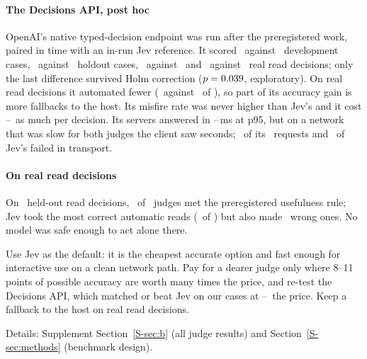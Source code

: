 \paragraph{The Decisions API, post hoc} OpenAI's native typed-decision endpoint was run after the preregistered work,
paired in time with an in-run Jev reference. It scored \OaDevLunaK\ against \OaDevJevK\ development cases,
\OaHoldoutLunaK\ against \OaHoldoutJevK\ holdout cases, \OaTraceDevLunaK\ against \OaTraceDevJevK\ and
\OaTraceHoldoutLunaK\ against \OaTraceHoldoutJevK\ real read decisions; only the last difference survived Holm
correction ($p = 0.039$, exploratory). On real read decisions it automated fewer (\OaTrHoldLunaCovK\ against
\OaTrHoldJevCovK\ of \OaTrHoldN), so part of its accuracy gain is more fallbacks to the host. Its misfire rate was never
higher than Jev's and it cost \OaPriceXLo--\OaPriceXHi\X\ as much per decision. Its servers answered in
\OaServerPninetyfiveLo--\OaServerPninetyfiveHi\,ms at p95, but on a network that was slow for both judges the client saw
seconds; \OaInvalid\ of its \OaRequests\ requests and \OaInvalidJev\ of Jev's failed in transport.

\paragraph{On real read decisions} On \TrN\ held-out read decisions, \TrNUseful\ of \NumBase\ judges met the
preregistered usefulness rule; Jev took the most correct automatic reads (\TrJevReads\ of \TrReadCases) but also made
\TrJevWaK\ wrong ones. No model was safe enough to act alone there.

\begin{keyidea}[title={For practitioners}]
Use Jev as the default: it is the cheapest accurate option and fast enough for interactive use on a clean network path.
Pay for a dearer judge only where 8--11 points of possible accuracy are worth many times the price, and re-test the
Decisions API, which matched or beat Jev on our cases at \OaPriceXLo--\OaPriceXHi\X\ the price. Keep a fallback to the
host on real read decisions.
\end{keyidea}

Details: Supplement Section~\ref{S-sec:b} (all judge results) and Section~\ref{S-sec:methods} (benchmark design).
